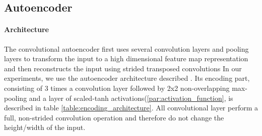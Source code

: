 \documentclass{article}
\begin{document}
  \subsection{Autoencoder}
  \label{sec:methods_autoencoder}

    \paragraph{Architecture}
    The convolutional autoencoder first uses several convolution layers and pooling layers to transform the input to a high dimensional feature map representation and then reconstructs the input using strided transposed convolutions 
    In our experiments, we use the autoencoder architecture described \citep{masci11}. Its encoding part, consisting of 3 times a convolution layer followed by 2x2 non-overlapping max-pooling and a layer of scaled-tanh activations(\ref{par:activation_function}, is described in table \ref{table:encoding_architecture}. All convolutional layer perform a full, non-strided convolution operation and therefore do not change the height/width of the input. 

    \begin{table}[h]

      \centering

        
      \caption{CAE/CNN: shared encoding layers. Channels refers to the amount of feature maps in the given layer}
      \label{table:encoding_architecture}

    \end{table}
\end{document}
